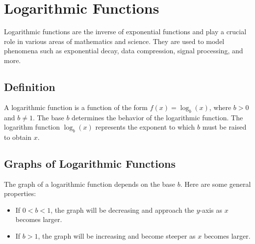 \documentclass[11pt]{article}
\begin{document}
\section{Logarithmic Functions}

Logarithmic functions are the inverse of exponential functions and play a crucial role in various areas of mathematics and science. They are used to model phenomena such as exponential decay, data compression, signal processing, and more. 

\subsection{Definition}

A logarithmic function is a function of the form $f(x) = \log_b(x)$, where $b > 0$ and $b \neq 1$. The base $b$ determines the behavior of the logarithmic function. The logarithm function $\log_b(x)$ represents the exponent to which $b$ must be raised to obtain $x$.

\subsection{Graphs of Logarithmic Functions}

The graph of a logarithmic function depends on the base $b$. Here are some general properties:

\begin{itemize}
  \item If $0 < b < 1$, the graph will be decreasing and approach the $y$-axis as $x$ becomes larger.
  \item If $b > 1$, the graph will be increasing and become steeper as $x$ becomes larger.
\end{itemize}

\begin{center}
\hspace{3em}
\end{center}
\end{document}
